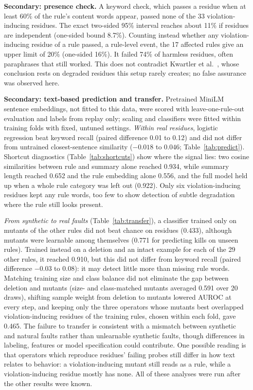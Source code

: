 \documentclass[10pt]{article}
\theoremstyle{definition}
\begin{document}




\textbf{Secondary: presence check.} A keyword check, which passes a residue when at least 60\% of the rule's content words appear, passed none of the 33 violation-inducing residues. The exact two-sided 95\% interval reaches about 11\% if residues are independent (one-sided bound 8.7\%). Counting instead whether any violation-inducing residue of a rule passed, a rule-level event, the 17 affected rules give an upper limit of 20\% (one-sided 16\%). It failed 74\% of harmless residues, often paraphrases that still worked. This does not contradict Kwartler et al.~\cite{kwartler2026}, whose conclusion rests on degraded residues this setup rarely creates; no false assurance was observed here.

\textbf{Secondary: text-based prediction and transfer.} Pretrained MiniLM sentence embeddings, not fitted to this data, were scored with leave-one-rule-out evaluation and labels from replay only; scaling and classifiers were fitted within training folds with fixed, untuned settings. \emph{Within real residues}, logistic regression beat keyword recall (paired difference 0.01 to 0.12) and did not differ from untrained closest-sentence similarity ($-0.018$ to $0.046$; Table~\ref{tab:predict}). Shortcut diagnostics (Table~\ref{tab:shortcuts}) show where the signal lies: two cosine similarities between rule and summary alone reached 0.934, while summary length reached 0.652 and the rule embedding alone 0.556, and the full model held up when a whole rule category was left out (0.922). Only six violation-inducing residues kept any rule words, too few to show detection of subtle degradation where the rule still looks present.

\emph{From synthetic to real faults} (Table~\ref{tab:transfer}), a classifier trained only on mutants of the other rules did not beat chance on residues (0.433), although mutants were learnable among themselves (0.771 for predicting kills on unseen rules). Trained instead on a deletion and an intact example for each of the 29 other rules, it reached 0.910, but this did not differ from keyword recall (paired difference $-0.03$ to $0.08$): it may detect little more than missing rule words. Matching training size and class balance did not eliminate the gap between deletion and mutants (size- and class-matched mutants averaged 0.591 over 20 draws), shifting sample weight from deletion to mutants lowered AUROC at every step, and keeping only the three operators whose mutants best overlapped violation-inducing residues of the training rules, chosen within each fold, gave 0.465. The failure to transfer is consistent with a mismatch between synthetic and natural faults rather than unlearnable synthetic faults, though differences in labeling, features or model specification could contribute. One possible reading is that operators which reproduce residues' failing probes still differ in how text relates to behavior: a violation-inducing mutant still reads as a rule, while a violation-inducing residue mostly has none. All of these analyses were run after the other results were known.
\end{document}

